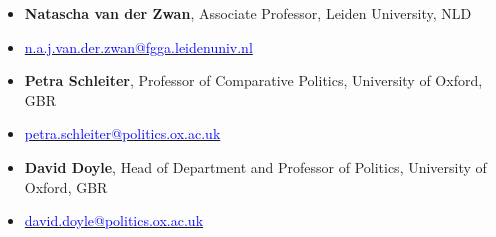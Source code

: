 \begin{publications}

\begin{itemize}
\item[]{\small {\bfseries Natascha van der Zwan}, Associate Professor, Leiden University, NLD}
\item[]{\vspace{-1mm}\textcolor{oxfordblue}{\faEnvelope} \hspace{0.1mm} {\small \href{mailto:n.a.j.van.der.zwan@fgga.leidenuniv.nl}{\textcolor{blue}{n.a.j.van.der.zwan@fgga.leidenuniv.nl}}}} \vspace{1.5mm}
\item[]{\small {\bfseries Petra Schleiter}, Professor of Comparative Politics, University of Oxford, GBR}
\item[]{\vspace{-1mm}\textcolor{oxfordblue}{\faEnvelope} \hspace{0.1mm} {\small \href{mailto:petra.schleiter@politics.ox.ac.uk}{\textcolor{blue}{petra.schleiter@politics.ox.ac.uk}}}} \vspace{1.5mm}
\item[]{\small {\bfseries David Doyle}, Head of Department and Professor of Politics, University of Oxford, GBR}
\item[]{\vspace{-1mm}\textcolor{oxfordblue}{\faEnvelope} \hspace{0.1mm} {\small \href{mailto:david.doyle@politics.ox.ac.uk}{\textcolor{blue}{david.doyle@politics.ox.ac.uk}}}} \vspace{1.5mm}
\end{itemize}

\end{publications}
